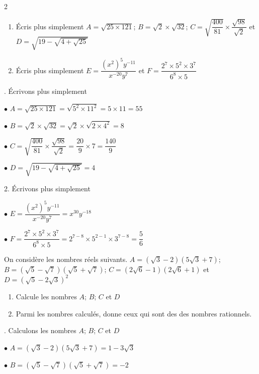 \begin{multicols*}{2}
  	\begin{enumerate}
  		\item Écris plus simplement
  		$A= \sqrt{25\times 121}$; $B= \sqrt{2}\times \sqrt{32}$; $C=\sqrt{\dfrac{400}{81}}\times \dfrac{\sqrt{98}}{\sqrt{2}}$ et $D= \sqrt{19-\sqrt{4+\sqrt{25}}}$
  		\item  	Écris plus simplement
  		$E=\dfrac{(x^2)^5y^{-11}}{x^{-20}y^{7}}$ et $F=\dfrac{2^7\times 5^{2}\times 3^{7}}{6^{8} \times 5}$
  	\end{enumerate}
  	\dure 
  	. Écrivons plus simplement
  	
  	$\bullet$ $A= \sqrt{25\times 121}=\sqrt{5^2\times 11^2}=5\times11=55$
  	
  	$\bullet$ $B= \sqrt{2}\times \sqrt{32}=\sqrt{2}\times \sqrt{2\times4^2}=8$
  	
  	$\bullet$ $C=\sqrt{\dfrac{400}{81}}\times \dfrac{\sqrt{98}}{\sqrt{2}}=\dfrac{20}{9}\times 7=\dfrac{140}{9}$
  	
  	$\bullet$ $D= \sqrt{19-\sqrt{4+\sqrt{25}}}=4$
  	
  	2.  Écrivons plus simplement
  	
  	$\bullet$  $E=\dfrac{(x^2)^5y^{-11}}{x^{-20}y^{7}}=x^{30}y^{-18}$
  	
  	$\bullet$ $F=\dfrac{2^7\times 5^{2}\times 3^{7}}{6^{8} \times 5}=2^{7-8}\times 5^{2-1}\times 3^{7-8}=\dfrac{5}{6}$ 
  	
  	
  	On considère les nombres réels suivants.
  	$A=\left(\sqrt{3}-2 \right)\left(5\sqrt{3}+7 \right)$; $B=\left(\sqrt{5}-\sqrt{7} \right)\left(\sqrt{5}+\sqrt{7}\right)$; $C= \left(2\sqrt{6}-1 \right)\left(2\sqrt{6}+1 \right)$ et $D=\left(\sqrt{5}-2\sqrt{3} \right)^2$
  	\begin{enumerate}
  		\item Calcule les nombres $A$; $B$; $C$ et $D$
  		\item  Parmi les nombres calculés, donne ceux qui sont des des nombres rationnels.
  	\end{enumerate}
  	\dure
  	. Calculons les nombres $A$; $B$; $C$ et $D$
  	
  	$\bullet$ $A=\left(\sqrt{3}-2 \right)\left(5\sqrt{3}+7 \right)=1-3\sqrt{3}$
  	
  	$\bullet$ $B=\left(\sqrt{5}-\sqrt{7} \right)\left(\sqrt{5}+\sqrt{7}\right)=-2$
  	

\end{multicols*}
